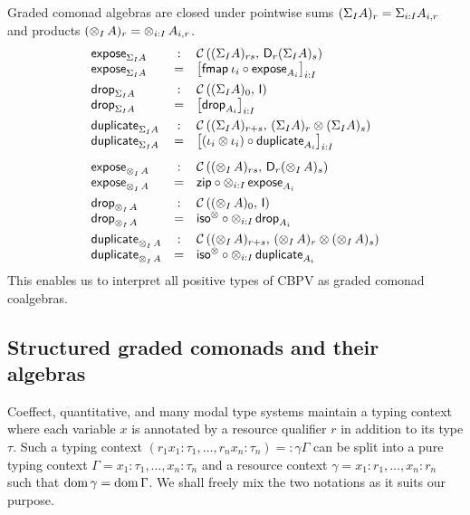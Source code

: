 \documentclass[acmsmall,review,anonymous]{acmart}\settopmatter{printfolios=true,printccs=false,printacmref=false}
\begin{document}
Graded comonad algebras are closed under pointwise sums $(\sumt I A)_r = \sumt {i:I} {A_{i,r}}$ and products $(\tupt I A)_r = \tupt {i:I} {A_{i,r}}$.
\[
\begin{array}{lcl}
  \expose[\sumt I A] & : & \Hom {(\sumt I A)_{rs}} {\D[r](\sumt I A)_s} \\
  \expose[\sumt I A] & = & \left[  \fmap{\iota_i} \comp \expose[A_i] \right]_{i:I}
\\[1ex]
  \tdrop[\sumt I A] & : & \Hom {(\sumt I A)_0} \I \\
  \tdrop[\sumt I A] & = & \left[ \tdrop[A_i] \right]_{i:I}
\\[1ex]
  \duplicate[\sumt I A] & : & \Hom {(\sumt I A)_{r+s}} {(\sumt I A)_r \otimes (\sumt I A)_s} \\
  \duplicate[\sumt I A] & = & \left[ (\iota_i \otimes \iota_i) \comp \duplicate[A_i] \right]_{i:I}
\\[2ex]
  \expose[\tupt I A] & : & \Hom {(\tupt I A)_{rs}} {\D[r](\tupt I A)_s} \\
  \expose[\tupt I A] & = & \tzip \comp \tupt {i:I} {\expose[A_i]}
\\[1ex]
  \tdrop[\tupt I A] & : & \Hom {(\tupt I A)_0} \I \\
  \tdrop[\tupt I A] & = & \isot \comp \tupt {i:I} {\tdrop[A_i]}
\\[1ex]
  \duplicate[\tupt I A] & : & \Hom {(\tupt I A)_{r+s}} {(\tupt I A)_r \otimes (\tupt I A)_s} \\
  \duplicate[\tupt I A] & = & \isot \comp \tupt {i:I} {\duplicate[A_i]}
\end{array}
\]
This enables us to interpret all positive types of CBPV as graded
comonad coalgebras.


\subsection{Structured graded comonads and their algebras}

Coeffect, quantitative, and many modal type systems maintain a typing
context where each variable $x$ is annotated by a resource qualifier
$r$ in addition to its type $\tau$.  Such a typing context
$(r_1x_1{:}\tau_1, \dots, r_nx_n{:}\tau_n) =: \gamma\Gamma$ can be
split into a pure typing context
$\Gamma = x_1{:}\tau_1, \dots, x_n{:}\tau_n$ and a resource context
$\gamma = x_1{:}r_1, \dots, x_n{:}r_n$ such that
$\dom \gamma = \dom \Gamma$.  We shall freely mix the two notations as
it suits our purpose.
\end{document}

